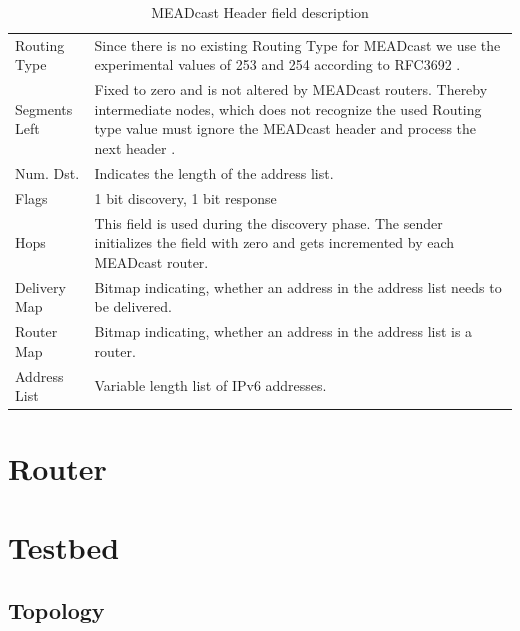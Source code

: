 \bgroup
\begin{table}[h!]
\centering
\def\arraystretch{1.5}%
\setlength{\tabcolsep}{1.2em}
\begin{tabularx}{\textwidth}{lX}
Routing Type  & Since there is no existing Routing Type for MEADcast we use the
                experimental values of 253 and 254 according to RFC3692
                \cite{rfc3692_ipv6_rt_type}.\\
Segments Left & Fixed to zero and is not altered by MEADcast routers. Thereby
                intermediate nodes, which does not recognize the used Routing
                type value must ignore the MEADcast header and process the next
                header \cite{rfc8200_ipv6_hdr}.\\
Num. Dst.     & Indicates the length of the address list. \\
Flags         & 1 bit discovery, 1 bit response        \\
Hops          & This field is used during the discovery phase. The sender
                initializes the field with zero and gets incremented by each
                MEADcast router. \\
Delivery Map  & Bitmap indicating, whether an address in the address list needs
                to be delivered.\\
Router Map    & Bitmap indicating, whether an address in the address list is a
                router.\\
Address List  & Variable length list of IPv6 addresses. \\
\end{tabularx}
\caption{MEADcast Header field description}
\label{tab:my-table}
\end{table}
\egroup

\section{Router} %
\label{sec:Router}



\section{Testbed} %
\label{sec:Testbed_Implementation}
\subsection{Topology} %
\label{sub:Topology}

